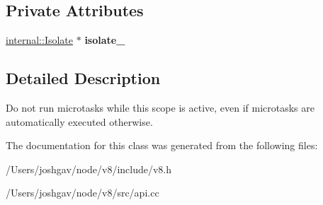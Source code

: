\subsection*{Private Attributes}
\begin{DoxyCompactItemize}
\item 
\hyperlink{classv8_1_1internal_1_1_isolate}{internal\+::\+Isolate} $\ast$ {\bfseries isolate\+\_\+}\hypertarget{classv8_1_1_isolate_1_1_suppress_microtask_execution_scope_a1d3f31824c96bc8db01a0eb8bb6137d4}{}\label{classv8_1_1_isolate_1_1_suppress_microtask_execution_scope_a1d3f31824c96bc8db01a0eb8bb6137d4}

\end{DoxyCompactItemize}


\subsection{Detailed Description}
Do not run microtasks while this scope is active, even if microtasks are automatically executed otherwise. 

The documentation for this class was generated from the following files\+:\begin{DoxyCompactItemize}
\item 
/\+Users/joshgav/node/v8/include/v8.\+h\item 
/\+Users/joshgav/node/v8/src/api.\+cc\end{DoxyCompactItemize}

